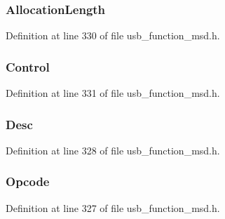 \subsubsection[{Allocation\+Length}]{ Allocation\+Length}\label{struct_request_sense_c_b_a8c0a66f23ee960de672d690626364354}


Definition at line 330 of file usb\+\_\+function\+\_\+msd.\+h.

\hypertarget{struct_request_sense_c_b_a5dc24656c27deb12af74c98930f0bfc5}{}
\subsubsection[{Control}]{ Control}\label{struct_request_sense_c_b_a5dc24656c27deb12af74c98930f0bfc5}


Definition at line 331 of file usb\+\_\+function\+\_\+msd.\+h.

\hypertarget{struct_request_sense_c_b_ab53b187a02cb259546e71f45d3b3e196}{}
\subsubsection[{Desc}]{ Desc}\label{struct_request_sense_c_b_ab53b187a02cb259546e71f45d3b3e196}


Definition at line 328 of file usb\+\_\+function\+\_\+msd.\+h.

\hypertarget{struct_request_sense_c_b_a3ac7536b907732d60214ae553910eed9}{}
\subsubsection[{Opcode}]{ Opcode}\label{struct_request_sense_c_b_a3ac7536b907732d60214ae553910eed9}


Definition at line 327 of file usb\+\_\+function\+\_\+msd.\+h.

\hypertarget{struct_request_sense_c_b_a3aef54172eb78efe737c8eb7b0093d3c}{}
